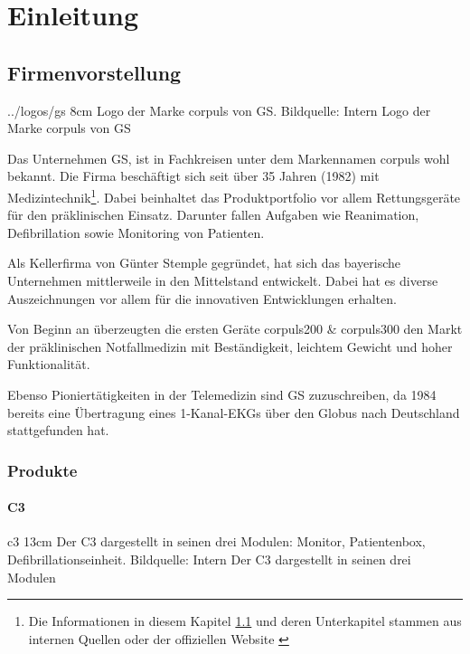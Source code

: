 \chapter{Einleitung}
\label{einleitung}
\minitoc\pagebreak


\section{Firmenvorstellung}
\label{sec:firma}
\bild
{../logos/gs}
{8cm}
{Logo der Marke \glqq corpuls\grqq{} von \acrlong*{GS}. Bildquelle: Intern}
{Logo der Marke \glqq corpuls\grqq{} von GS}

Das Unternehmen \gls{GS}, ist in Fachkreisen unter dem Markennamen \glqq corpuls\grqq{} wohl bekannt. 
Die Firma beschäftigt sich seit über 35 Jahren (1982) mit Medizintechnik\footnote{Die Informationen in diesem Kapitel \ref{sec:firma} und deren Unterkapitel stammen aus internen Quellen oder der offiziellen Website \cite{GSElektromedizinischeGerateG.StempleGmbH.}}.
Dabei beinhaltet das Produktportfolio vor allem Rettungsgeräte für den präklinischen Einsatz.
Darunter fallen Aufgaben wie Reanimation, Defibrillation sowie Monitoring von Patienten. 

Als Kellerfirma von Günter Stemple gegründet, hat sich das bayerische Unternehmen mittlerweile in den Mittelstand entwickelt.
Dabei hat es diverse Auszeichnungen vor allem für die innovativen Entwicklungen erhalten.

Von Beginn an überzeugten die ersten Geräte corpuls200 \& corpuls300 den Markt der präklinischen Notfallmedizin mit Beständigkeit, leichtem Gewicht und hoher Funktionalität. 

Ebenso Pioniertätigkeiten in der Telemedizin sind \gls{GS} zuzuschreiben, da 1984 bereits eine Übertragung eines 1-Kanal-\gls{EKG}s über den Globus nach Deutschland stattgefunden hat.


\subsection{Produkte}

\subsubsection{\acrlong*{C3}}
\bild
{c3}
{13cm}
{Der \acrlong{C3} dargestellt in seinen drei Modulen: Monitor, Patientenbox, Defibrillationseinheit. Bildquelle: Intern}
{Der \acrlong*{C3} dargestellt in seinen drei Modulen}

